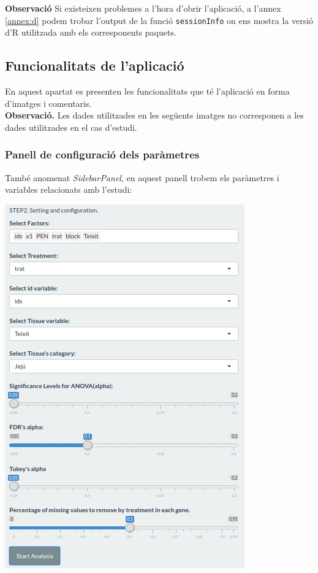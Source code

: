 \documentclass[english]{article}
\begin{document}
\textbf{Observació}  Si existeixen problemes a l'hora d'obrir l'aplicació, a l'annex \ref{annex:d} podem trobar l'output de la funció \texttt{sessionInfo} on ens mostra la versió d'R utilitzada amb els corresponents paquets.
\clearpage
\subsection{Funcionalitats de l'aplicació}
En aquest apartat es presenten les funcionalitats que té l'aplicació en forma d'imatges i comentaris.
\\

\textbf{Observació.} Les dades utilitzades en les següents imatges no corresponen a les dades utilitzades en el cas d'estudi.
\subsubsection{Panell de configuració dels paràmetres}
També anomenat \textit{SidebarPanel}, en aquest panell trobem els paràmetres i variables relacionats amb l'estudi:
\begin{center}
\includegraphics[scale=0.6]{app2.png}
\end{center}
\end{document}
